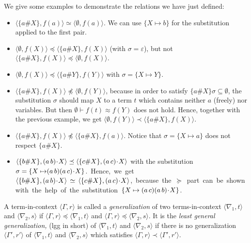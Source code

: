 \documentclass{llncs}
\newcommand{\swap}[2]{\ensuremath{(#1\, #2)}}
\newcommand{\permap}{{\mkern 1mu\cdot \mkern 1mu}}
\newcommand{\ids}{\varepsilon}
\newcommand{\np}[2]{\langle #1, \allowbreak #2\rangle}
\begin{document}
\begin{example}
We give some examples to demonstrate the relations we have just defined:
\begin{itemize}
\item $\np{\{a\#X\}}{f(a)} \simeq \np{\emptyset}{f(a)}$. We can use $
  \{X\mapsto b\}$ for the substitution applied to the first pair.
\item $\np{\emptyset}{f(X)} \preceq \np{\{a\#X\}}{f(X)}$ (with
  $\sigma=\ids$), but not $\np{\{a\#X\}}{f(X)} \preceq
  \np{\emptyset}{f(X)}$.
\item $\np{\emptyset}{f(X)}\preceq \np{\{a\#Y\}}{f(Y)}$ with $\sigma= \{X\mapsto Y\}$.
\item $\np{\{a\#X\}}{f(X)}\not \preceq \np{\emptyset}{f(Y)}$, because
  in order to satisfy $ \{a\# X\}\sigma \subseteq \emptyset$, the
  substitution $\sigma$ should map $ X$ to a term $ t$ which contains
  neither $a$ (freely) nor variables. But then $ \emptyset \vdash f(t)
  \approx f(Y)$ does not hold.  Hence, together with the previous
  example, we get $\np{\emptyset}{f(Y)}\prec \np{\{a\#X\}}{f(X)}$.
\item $\np{\{a\#X\}}{f(X)} \not\preceq \np{\{a\#X\}}{f(a)}$.  Notice
  that $\sigma=\{{ X\mapsto a}\}$ does not respect $\{{ a\#X}\}$.
\item $\np{\{b\#X\}}{\swap{a}{b}\permap X} \preceq \np{\{c\#X\}}{\swap{a}{c}\permap
  X} $ with the substitution $\sigma=\{ {X\mapsto} \allowbreak \swap{a}{b}\swap{a}{c}\permap
  X\}$.\, Hence,\, we\, get\, $\np{\{b\#X\}}{\swap{a}{b}\permap X}\, \simeq\,
  \np{\{c\#X\}}{\swap{a}{c}\permap X} $,\, because\, the\, $\succeq$\, part\, can\, be\,
  shown\, with\, the\, help\, of\, the\, substitution\, $\{ X\mapsto\allowbreak
    \swap{a}{c}\swap{a}{b}\permap X\}$.
\end{itemize}
\end{example}



\begin{definition}
A term-in-context $\np{\Gamma}{r}$ is called a \emph{generalization} of two terms-in-context $\np{\nabla_1}{t}$ and
$\np{\nabla_2}{s}$ if $\np{\Gamma}{r} \preceq \np{\nabla_1}{t}$
and $\np{\Gamma}{r} \preceq \np{\nabla_2}{s}$. It is the \emph{least
  general generalization,} (lgg in short) of $\np{\nabla_1}{t}$ and $\np{\nabla_2}{s}$ if
there is no generalization $\np{\Gamma'}{r'}$ of $\np{\nabla_1}{t}$
and $\np{\nabla_2}{s}$ which satisfies $\np{\Gamma}{r} \prec
\np{\Gamma'}{r'}$.
\end{definition}
\end{document}
